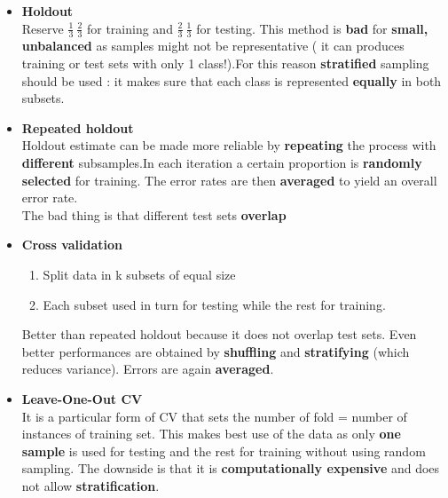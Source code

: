 \begin{itemize}

\item \textbf{Holdout}\\
Reserve $\frac{1}{3} \ \frac{2}{3}$ for training and $\frac{2}{3} \ \frac{1}{3}$ for testing. This method is \textbf{bad} for \textbf{small, unbalanced} as samples might not be representative ( it can produces training or test sets with only 1 class!).For this reason \textbf{stratified} sampling should be used : it makes sure that each class is represented \textbf{equally} in both subsets.
 
\item \textbf{Repeated holdout}\\
Holdout estimate can be made more reliable by \textbf{repeating} the process with \textbf{different} subsamples.In each iteration a certain proportion is \textbf{randomly selected} for training. The error rates are then \textbf{averaged} to yield an overall error rate.\\
The bad thing is that different test sets \textbf{overlap}

\item  \textbf{Cross validation}\\
\begin{enumerate}
\item Split data in k subsets of equal size
\item Each subset used in turn for testing while the rest for training.
\end{enumerate}
Better than repeated holdout because it does not overlap test sets. Even better performances are obtained by \textbf{shuffling} and \textbf{stratifying} (which reduces variance). Errors are again \textbf{averaged}.

\item \textbf{Leave-One-Out CV}\\
It is a particular form of CV that sets the number of fold = number of instances of training set. This makes best use of the data as only \textbf{one sample} is used for testing and the rest for training without using random sampling. The downside is that it is \textbf{computationally expensive} and does not allow \textbf{stratification}.


\end{itemize}
